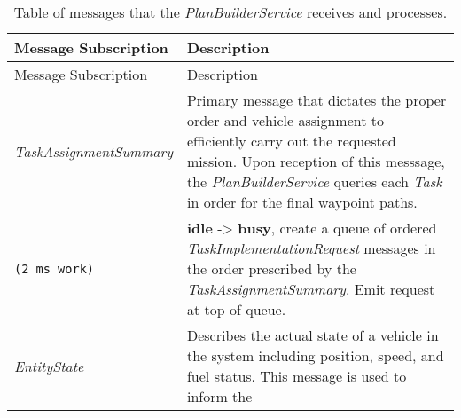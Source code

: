 \begin{longtable}[c]{@{}ll@{}}
\caption{Table of messages that the \emph{PlanBuilderService} receives
and processes.}\tabularnewline
\toprule
\begin{minipage}[b]{0.29\columnwidth}\raggedright\strut
Message Subscription
\strut\end{minipage} &
\begin{minipage}[b]{0.65\columnwidth}\raggedright\strut
Description
\strut\end{minipage}\tabularnewline
\midrule
\endfirsthead
\toprule
\begin{minipage}[b]{0.29\columnwidth}\raggedright\strut
Message Subscription
\strut\end{minipage} &
\begin{minipage}[b]{0.65\columnwidth}\raggedright\strut
Description
\strut\end{minipage}\tabularnewline
\midrule
\endhead
\begin{minipage}[t]{0.29\columnwidth}\raggedright\strut
\emph{TaskAssignmentSummary}
\strut\end{minipage} &
\begin{minipage}[t]{0.65\columnwidth}\raggedright\strut
Primary message that dictates the proper order and vehicle assignment to
efficiently carry out the requested mission. Upon reception of this
messsage, the \emph{PlanBuilderService} queries each \emph{Task} in
order for the final waypoint paths.
\strut\end{minipage}\tabularnewline
\begin{minipage}[t]{0.29\columnwidth}\raggedright\strut
\begin{verbatim}
(2 ms work)
\end{verbatim}
\strut\end{minipage} &
\begin{minipage}[t]{0.65\columnwidth}\raggedright\strut
\textbf{idle} -\textgreater{} \textbf{busy}, create a queue of ordered
\emph{TaskImplementationRequest} messages in the order prescribed by the
\emph{TaskAssignmentSummary}. Emit request at top of queue.
\strut\end{minipage}\tabularnewline
\begin{minipage}[t]{0.29\columnwidth}\raggedright\strut
\emph{EntityState}
\strut\end{minipage} &
\begin{minipage}[t]{0.65\columnwidth}\raggedright\strut
Describes the actual state of a vehicle in the system including
position, speed, and fuel status. This message is used to inform the

\end{minipage}
\end{longtable}
